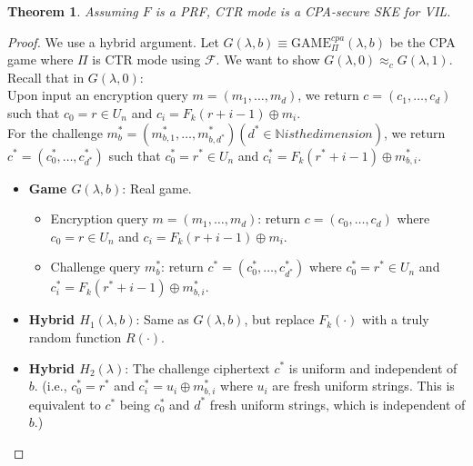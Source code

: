 \documentclass[11pt, a4paper]{article}
\newcommand{\N}{\mathbb{N}}
\newcommand{\game}{\text{GAME}}
\newtheorem{thm}{Theorem}
\begin{document}
\begin{thm}
Assuming $F$ is a PRF, CTR mode is a CPA-secure SKE for VIL. 
\end{thm}
\begin{proof}
We use a hybrid argument.
Let $G(\lambda, b) \equiv \game_{\Pi}^{cpa}(\lambda, b)$ be the CPA game where $\Pi$ is CTR mode using $\mathcal{F}$. We want to show $G(\lambda, 0) \approx_c G(\lambda, 1)$. 
Recall that in $G(\lambda,0)$:\\
Upon input an encryption query $m = (m_1, \dots, m_d)$, we return $c = (c_1, \dots, c_d)$ such that $c_0 = r \in U_n$ and $c_i = F_k(r+i-1) \oplus m_i$.\\
For the challenge $m_b^* = (m_{b,1}^*, \dots, m_{b,d^*}^*) (d^* \in \N is the dimension)$, we return $c^* = (c_0^*, \dots, c_{d^*}^*)$ such that $c_0^* = r^* \in U_n$ and $c_i^* = F_k(r^*+i-1) \oplus m_{b,i}^*$.\\
\begin{itemize}
    \item \textbf{Game $G(\lambda, b)$}: Real game.
    \begin{itemize}
        \item Encryption query $m=(m_1, \dots, m_d)$: return $c=(c_0, \dots, c_d)$ where $c_0 = r \in U_n$ and $c_i = F_k(r+i-1) \oplus m_i$. 
        \item Challenge query $m_b^*$: return $c^*=(c_0^*, \dots, c_{d^*}^*)$ where $c_0^* = r^* \in U_n$ and $c_i^* = F_k(r^*+i-1) \oplus m_{b,i}^*$. 
    \end{itemize}
    \item \textbf{Hybrid $H_1(\lambda, b)$}: Same as $G(\lambda, b)$, but replace $F_k(\cdot)$ with a truly random function $R(\cdot)$. 
    \item \textbf{Hybrid $H_2(\lambda)$}: The challenge ciphertext $c^*$ is uniform and independent of $b$. (i.e., $c_0^* = r^*$ and $c_i^* = u_i \oplus m_{b,i}^*$ where $u_i$ are fresh uniform strings. This is equivalent to $c^*$ being $c_0^*$ and $d^*$ fresh uniform strings, which is independent of $b$.)
\end{itemize}


\end{proof}
\end{document}
